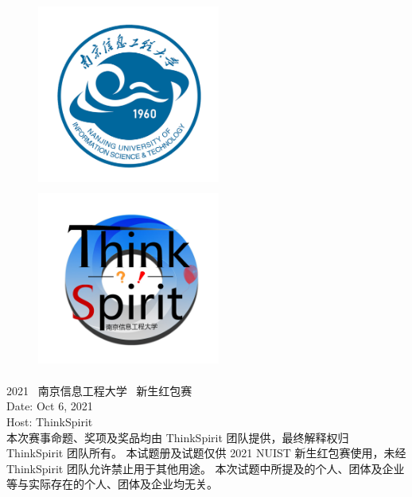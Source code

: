 \begin{titlepage}
    \begin{figure}[H]
        \centering
        \includegraphics[height=6cm,width=6cm]{src/Logo-NUIST.png}
        \includegraphics[height=6cm,width=6cm]{src/ThinkSpirit.jpg}
    \end{figure}
    {
        \centering
        {\huge 2021 \ 南京信息工程大学 \ 新生红包赛} \\
        \vspace{0.5cm}
        {\Large Date: Oct 6, 2021} \\
        \vspace{0.5cm}
        {\Large Host: ThinkSpirit} \\
        \tableofcontents
        \thispagestyle{empty}
    }
    \vspace{1cm}
    {\large 
    本次赛事命题、奖项及奖品均由 ThinkSpirit 团队提供，最终解释权归 ThinkSpirit 团队所有。
    本试题册及试题仅供 2021 NUIST 新生红包赛使用，未经 ThinkSpirit 团队允许禁止用于其他用途。
    本次试题中所提及的个人、团体及企业等与实际存在的个人、团体及企业均无关。} \\
 \end{titlepage}
 \restoregeometry